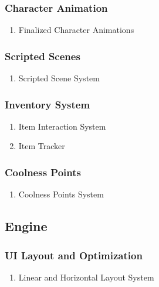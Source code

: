 \subsubsection{Character Animation}
\begin{enumerate}
\item Finalized Character Animations
\end{enumerate}
\subsubsection{Scripted Scenes}
\begin{enumerate}
\item Scripted Scene System
\end{enumerate}
\subsubsection{Inventory System}
\begin{enumerate}
\item Item Interaction System
\item Item Tracker
\end{enumerate}
\subsubsection{Coolness Points}
\begin{enumerate}
\item Coolness Points System
\end{enumerate}


\subsection{Engine}
\subsubsection{UI Layout and Optimization}
\begin{enumerate}
\item Linear and Horizontal Layout System
\end{enumerate}




